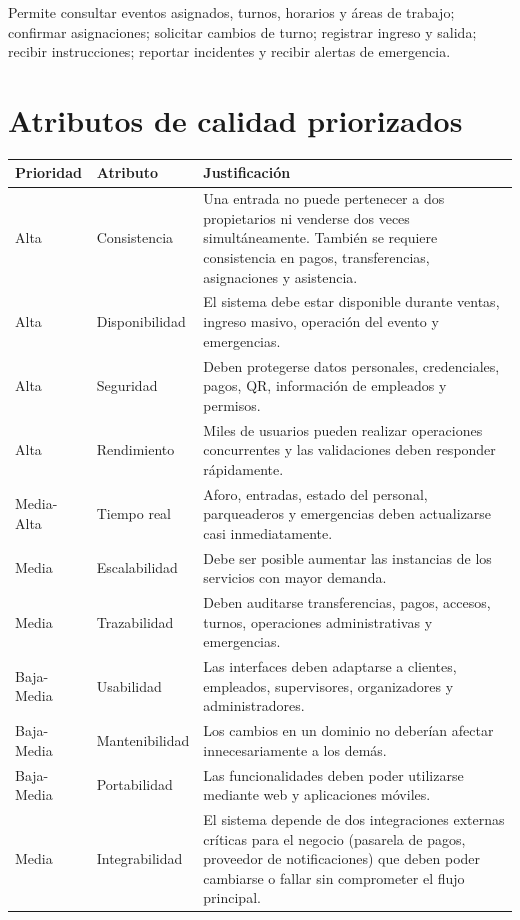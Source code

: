 \documentclass[12pt,a4paper]{article}
\begin{document}
Permite consultar eventos asignados, turnos, horarios y áreas de trabajo; confirmar asignaciones; solicitar cambios de turno; registrar ingreso y salida; recibir instrucciones; reportar incidentes y recibir alertas de emergencia.

\section{Atributos de calidad priorizados}

\begin{longtable}{p{2cm}p{3cm}p{9cm}}
\toprule
\textbf{Prioridad} & \textbf{Atributo} & \textbf{Justificación}\\
\midrule
Alta & Consistencia & Una entrada no puede pertenecer a dos propietarios ni venderse dos veces simultáneamente. También se requiere consistencia en pagos, transferencias, asignaciones y asistencia.\\
Alta & Disponibilidad & El sistema debe estar disponible durante ventas, ingreso masivo, operación del evento y emergencias.\\
Alta & Seguridad & Deben protegerse datos personales, credenciales, pagos, QR, información de empleados y permisos.\\
Alta & Rendimiento & Miles de usuarios pueden realizar operaciones concurrentes y las validaciones deben responder rápidamente.\\
Media-Alta & Tiempo real & Aforo, entradas, estado del personal, parqueaderos y emergencias deben actualizarse casi inmediatamente.\\
Media & Escalabilidad & Debe ser posible aumentar las instancias de los servicios con mayor demanda.\\
Media & Trazabilidad & Deben auditarse transferencias, pagos, accesos, turnos, operaciones administrativas y emergencias.\\
Baja-Media & Usabilidad & Las interfaces deben adaptarse a clientes, empleados, supervisores, organizadores y administradores.\\
Baja-Media & Mantenibilidad & Los cambios en un dominio no deberían afectar innecesariamente a los demás.\\
Baja-Media & Portabilidad & Las funcionalidades deben poder utilizarse mediante web y aplicaciones móviles.\\
Media & Integrabilidad & El sistema depende de dos integraciones externas críticas para el negocio (pasarela de pagos, proveedor de notificaciones) que deben poder cambiarse o fallar sin comprometer el flujo principal.\\

\end{longtable}
\end{document}
